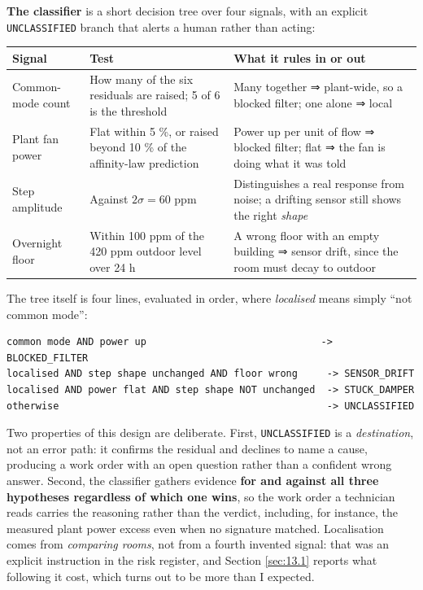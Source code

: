 \textbf{The classifier} is a short decision tree over four signals, with an explicit
\texttt{UNCLASSIFIED} branch that alerts a human rather than acting:

\begin{longtable}[]{@{}
  >{\raggedright\arraybackslash}p{}
  >{\raggedright\arraybackslash}p{}
  >{\raggedright\arraybackslash}p{}@{}}
\toprule
\textbf{Signal} & \textbf{Test} & \textbf{What it rules in or out} \\
\midrule
\endhead
Common-mode count & How many of the six residuals are raised; 5 of 6 is the threshold & Many
together ⇒ plant-wide, so a blocked filter; one alone ⇒ local \\
Plant fan power & Flat within 5 \%, or raised beyond 10 \% of the affinity-law prediction & Power
up per unit of flow ⇒ blocked filter; flat ⇒ the fan is doing what it was told \\
Step amplitude & Against $2\sigma = 60$ ppm & Distinguishes a real response from noise; a drifting
sensor still shows the right \emph{shape} \\
Overnight floor & Within 100 ppm of the 420 ppm outdoor level over 24 h & A wrong floor with an
empty building ⇒ sensor drift, since the room must decay to outdoor \\
\bottomrule
\end{longtable}

The tree itself is four lines, evaluated in order, where \emph{localised} means simply ``not common
mode'':

\begin{footnotesize}
\begin{verbatim}
common mode AND power up                              -> BLOCKED_FILTER
localised AND step shape unchanged AND floor wrong     -> SENSOR_DRIFT
localised AND power flat AND step shape NOT unchanged  -> STUCK_DAMPER
otherwise                                              -> UNCLASSIFIED
\end{verbatim}
\end{footnotesize}

Two properties of this design are deliberate. First, \texttt{UNCLASSIFIED} is a \emph{destination},
not an error path: it confirms the residual and declines to name a cause, producing a work order
with an open question rather than a confident wrong answer. Second, the classifier gathers evidence
\textbf{for and against all three hypotheses regardless of which one wins}, so the work order a
technician reads carries the reasoning rather than the verdict, including, for instance, the
measured plant power excess even when no signature matched. Localisation comes from \emph{comparing
rooms}, not from a fourth invented signal: that was an explicit instruction in the risk register,
and Section \ref{sec:13.1} reports what following it cost, which turns out to be more than I expected.

